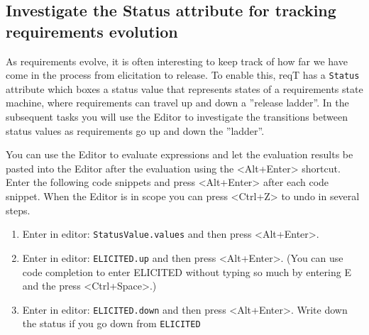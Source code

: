 \documentclass[11pt]{article}
\begin{document}
\subsection{Investigate the Status attribute for tracking requirements evolution}

As requirements evolve, it is often interesting to keep track of how far we have come in the process from elicitation to release. To enable this, reqT has a \verb+Status+ attribute which boxes a status value that  represents states of a requirements state machine, where requirements can travel up and down a  ''release ladder''. In the subsequent tasks you will use the Editor to investigate the transitions between status values as requirements go up and down the ''ladder''.  

\begin{framed}
\noindent You can use the Editor to evaluate expressions and let the evaluation results be pasted into the Editor after the evaluation using the <Alt+Enter> shortcut. Enter the following code snippets and press <Alt+Enter> after each code snippet. When the Editor is in scope you can press <Ctrl+Z> to undo in several steps.
\begin{enumerate}
\item Enter in editor: \verb+StatusValue.values+ and then press <Alt+Enter>.
\item Enter in editor: \verb+ELICITED.up+ and then press <Alt+Enter>. (You can use code completion to enter ELICITED without typing so much by entering E and the press <Ctrl+Space>.)
\item Enter in editor: \verb+ELICITED.down+ and then press <Alt+Enter>. Write down the status if you go down from \verb+ELICITED+ \underline{\hspace{3cm}}
\end{enumerate}
\end{framed}
\end{document}
